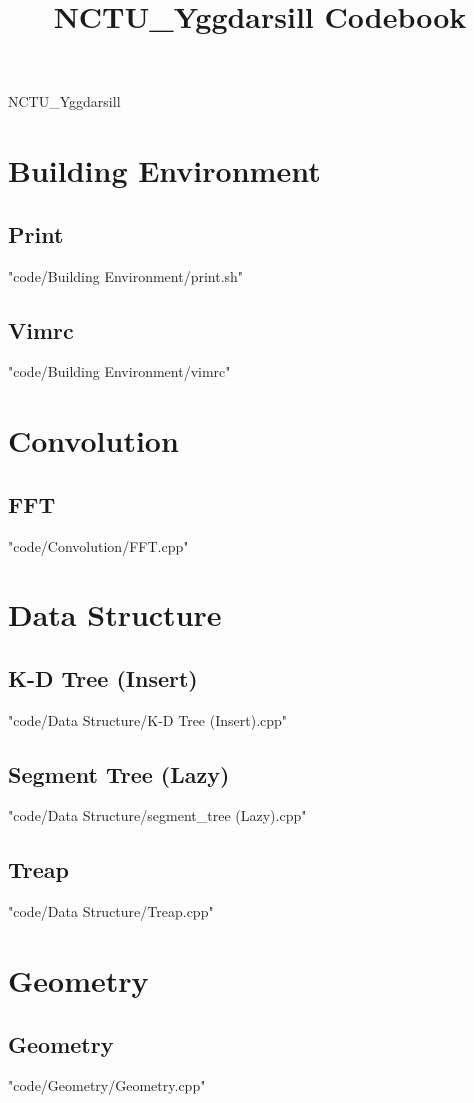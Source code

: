 \documentclass [landscape,8pt,a4paper,twocolumn]{article}
\title {NCTU\_Yggdarsill Codebook}
\begin{document}
\thispagestyle{fancy}
{ \Huge NCTU\_Yggdarsill}
\tableofcontents

\section{Building Environment}
\subsection{Print}
 {"code/Building Environment/print.sh"}
\subsection{Vimrc}
 {"code/Building Environment/vimrc"}
\section{Convolution}
\subsection{FFT}
 {"code/Convolution/FFT.cpp"}
\section{Data Structure}
\subsection{K-D Tree (Insert)}
 {"code/Data Structure/K-D Tree (Insert).cpp"}
\subsection{Segment Tree (Lazy)}
 {"code/Data Structure/segment_tree (Lazy).cpp"}
\subsection{Treap}
 {"code/Data Structure/Treap.cpp"}
\section{Geometry}
\subsection{Geometry}
 {"code/Geometry/Geometry.cpp"}
\end{document}
